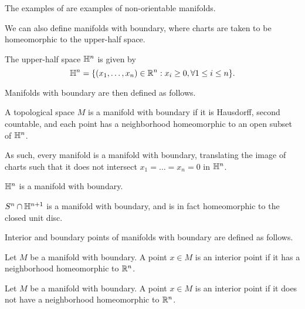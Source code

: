 \begin{remark}
    The examples of  are examples of non-orientable manifolds. 
\end{remark}
We can also define manifolds with boundary, where charts are taken to be homeomorphic to the upper-half space. 
\begin{definition}\label{def: upper-half space}
    The upper-half space $\mathbb{H}^{n}$ is given by 
    $$\mathbb{H}^{n}=\{(x_{1},\dots,x_{n})\in\mathbb{R}^{n}:x_{i}\geq0, \forall 1\leq i\leq n\}.$$
\end{definition}
Manifolds with boundary are then defined as follows. 
\begin{definition}\label{def: manifold with boundary}
    A topological space $M$ is a manifold with boundary if it is Hausdorff, second countable, and each point has a neighborhood homeomorphic to an open subset of $\mathbb{H}^{n}$. 
\end{definition}
\begin{remark}
    As such, every manifold is a manifold with boundary, translating the image of charts such that it does not intersect $x_{1}=\dots=x_{n}=0$ in $\mathbb{H}^{n}$. 
\end{remark}
\begin{example}
    $\mathbb{H}^{n}$ is a manifold with boundary. 
\end{example}
\begin{example}
    $S^{n}\cap\mathbb{H}^{n+1}$ is a manifold with boundary, and is in fact homeomorphic to the closed unit disc. 
\end{example}
Interior and boundary points of manifolds with boundary are defined as follows. 
\begin{definition}\label{def: interior point}
    Let $M$ be a manifold with boundary. A point $x\in M$ is an interior point if it has a neighborhood homeomorphic to $\mathbb{R}^{n}$. 
\end{definition}
\begin{definition}\label{def: boundary point}
    Let $M$ be a manifold with boundary. A point $x\in M$ is an interior point if it does not have a neighborhood homeomorphic to $\mathbb{R}^{n}$. 
\end{definition}